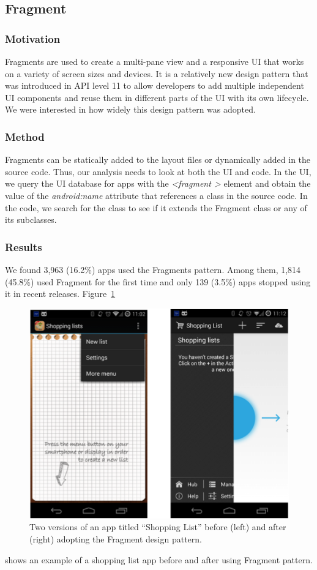 \subsection{Fragment}

\subsubsection{Motivation}
Fragments are used to create a multi-pane view and a responsive UI that works on a variety of screen sizes and devices. 
It is a relatively new design pattern that was introduced in API level 11 to allow developers to add multiple independent UI components and reuse them in different parts of the UI with its own lifecycle. 
We were interested in how widely this design pattern was adopted.

\subsubsection{Method}
Fragments can be statically added to the layout files or dynamically added in the source code. 
Thus, our analysis needs to look at both the UI and code. 
In the UI, we query the UI database for apps with the \textit{\textless fragment \textgreater} element and obtain the value of the \textit{android:name} attribute that references a class in the source code. 
In the code, we search for the class to see if it extends the Fragment class or any of its subclasses.

\subsubsection{Results}
We found 3,963 (16.2\%) apps used the Fragments pattern. 
Among them, 1,814 (45.8\%) used Fragment for the first time and only 139 (3.5\%) apps stopped using it in recent releases. 
Figure~\ref{fig:fig_fragment}
\begin{figure}[!t]
	\centering
	\includegraphics{figures/design-pattern-changes/fragment}
	\caption{Two versions of an app titled ``Shopping List'' before (left) and after (right) adopting the Fragment design pattern.}
	\label{fig:fig_fragment}
\end{figure}
shows an example of a shopping list app before and after using Fragment pattern.

